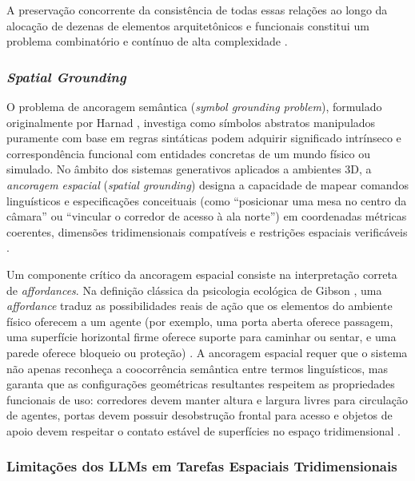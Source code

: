 A preservação concorrente da consistência de todas essas relações ao longo da alocação de dezenas de elementos arquitetônicos e funcionais constitui um problema combinatório e contínuo de alta complexidade \cite{xu2025constraint, feng2026repurposing3dgenerativemodel}.

\subsubsection{\textit{Spatial Grounding}}
\label{sec:conceito_spatial_grounding}

O problema de ancoragem semântica (\textit{symbol grounding problem}), formulado originalmente por Harnad \cite{harnad1990symbol}, investiga como símbolos abstratos manipulados puramente com base em regras sintáticas podem adquirir significado intrínseco e correspondência funcional com entidades concretas de um mundo físico ou simulado. No âmbito dos sistemas generativos aplicados a ambientes 3D, a \textit{ancoragem espacial} (\textit{spatial grounding}) designa a capacidade de mapear comandos linguísticos e especificações conceituais (como ``posicionar uma mesa no centro da câmara'' ou ``vincular o corredor de acesso à ala norte'') em coordenadas métricas coerentes, dimensões tridimensionais compatíveis e restrições espaciais verificáveis \cite{harnad1990symbol, hu2024scenecraft, sun2024roomplanner, chen2025narrative}.

Um componente crítico da ancoragem espacial consiste na interpretação correta de \textit{affordances}. Na definição clássica da psicologia ecológica de Gibson \cite{gibson1979ecological}, uma \textit{affordance} traduz as possibilidades reais de ação que os elementos do ambiente físico oferecem a um agente (por exemplo, uma porta aberta oferece passagem, uma superfície horizontal firme oferece suporte para caminhar ou sentar, e uma parede oferece bloqueio ou proteção) \cite{gibson1979ecological}. A ancoragem espacial requer que o sistema não apenas reconheça a coocorrência semântica entre termos linguísticos, mas garanta que as configurações geométricas resultantes respeitem as propriedades funcionais de uso: corredores devem manter altura e largura livres para circulação de agentes, portas devem possuir desobstrução frontal para acesso e objetos de apoio devem respeitar o contato estável de superfícies no espaço tridimensional \cite{sun2024roomplanner, xu2025constraint}.

\subsubsection{Limitações dos LLMs em Tarefas Espaciais Tridimensionais}
\label{sec:limitacoes_espaciais_llms}

